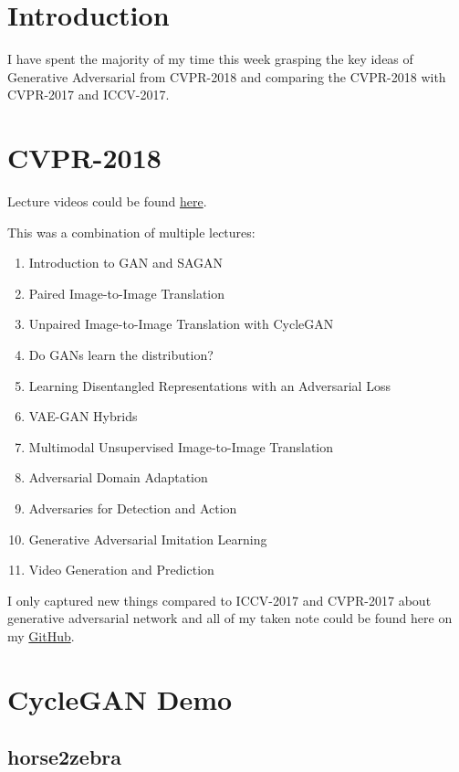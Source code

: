 \section{Introduction}
I have spent the majority of my time this week grasping the key ideas of Generative Adversarial from CVPR-2018\cite{cvpr18} and comparing the CVPR-2018 with CVPR-2017\cite{cvpr17} and ICCV-2017\cite{iccv17}.

\section{CVPR-2018}
Lecture videos could be found \href{https://www.youtube.com/playlist?list=PLvV9zfwRURxfydKkbFlyqn-GFsTY8-zRH}{here}.

This was a combination of multiple lectures:
\begin{enumerate}
\item Introduction to GAN\cite{gan} and SAGAN\cite{sagan}\cite{spectralnorm}
\item Paired Image-to-Image Translation\cite{pix2pix}\cite{pix2pixhd}
\item Unpaired Image-to-Image Translation with CycleGAN\cite{cyclegan}\cite{bicyclegan}
\item Do GANs learn the distribution?
\item Learning Disentangled Representations with an Adversarial Loss
\item VAE-GAN Hybrids
\item Multimodal Unsupervised Image-to-Image Translation
\item Adversarial Domain Adaptation
\item Adversaries for Detection and Action\cite{a-fast-rcnn}\cite{fast-rcnn}
\item Generative Adversarial Imitation Learning
\item Video Generation and Prediction
\end{enumerate}

I only captured new things compared to ICCV-2017 and CVPR-2017 about generative adversarial network and all of my taken note could be found here on my \href{https://github.com/tlvu2697/collection--generative-adversarial-network/tree/master/cvpr-18}{GitHub}.

\section{CycleGAN Demo}\cite{cyclegangithub}
\subsection{horse2zebra}

